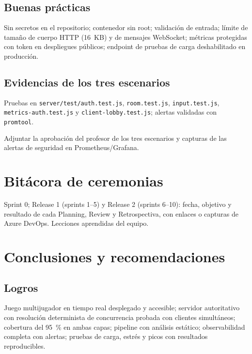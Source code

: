 \documentclass[11pt,a4paper]{article}
\begin{document}
\subsection{Buenas prácticas}
Sin secretos en el repositorio; contenedor sin root; validación de entrada;
límite de tamaño de cuerpo HTTP (16~KB) y de mensajes WebSocket; métricas
protegidas con token en despliegues públicos; endpoint de pruebas de carga
deshabilitado en producción.

\subsection{Evidencias de los tres escenarios}
Pruebas en \texttt{server/test/auth.test.js}, \texttt{room.test.js},
\texttt{input.test.js}, \texttt{metrics-auth.test.js} y
\texttt{client-lobby.test.js}; alertas validadas con \texttt{promtool}.
\begin{pendiente}
Adjuntar la aprobación del profesor de los tres escenarios y capturas de
las alertas de seguridad en Prometheus/Grafana.
\end{pendiente}

\section{Bitácora de ceremonias}
\begin{pendiente}
Sprint 0; Release 1 (sprints 1--5) y Release 2 (sprints 6--10): fecha,
objetivo y resultado de cada Planning, Review y Retrospectiva, con enlaces
o capturas de Azure DevOps. Lecciones aprendidas del equipo.
\end{pendiente}

\section{Conclusiones y recomendaciones}
\subsection{Logros}
Juego multijugador en tiempo real desplegado y accesible; servidor
autoritativo con resolución determinista de concurrencia probada con
clientes simultáneos; cobertura del 95~\% en ambas capas; pipeline con
análisis estático; observabilidad completa con alertas; pruebas de carga,
estrés y picos con resultados reproducibles.
\end{document}
